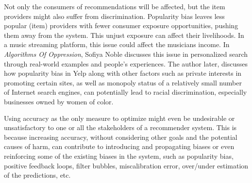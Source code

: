 Not only the consumers of recommendations will be affected, but the item providers might also suffer from discrimination. Popularity bias leaves less popular (item) providers with fewer consumer exposure opportunities, pushing them away from the system. This unjust exposure can affect their livelihoods. In a music streaming platform, this issue could affect the musicians income. In \textit{Algorithms Of Oppression}, Sofiya Noble \cite{noble2018algorithms} discusses this issue in personalized search through real-world examples and people's experiences. The author later, discusses how popularity bias in Yelp along with other factors such as private interests in promoting certain sites, as well as monopoly status of a relatively small number of Internet search engines, can potentially lead to racial discrimination, especially businesses owned by women of color.


Using accuracy as the only measure to optimize might even be undesirable or unsatisfactory to one or all the stakeholders of a recommender system. This is because increasing accuracy, without considering other goals and the potential causes of harm, can contribute to introducing and propagating biases or even reinforcing some of the existing biases in the system, such as popularity bias, positive feedback loops, filter bubbles, miscalibration error, over/under estimation of the predictions, etc. 





